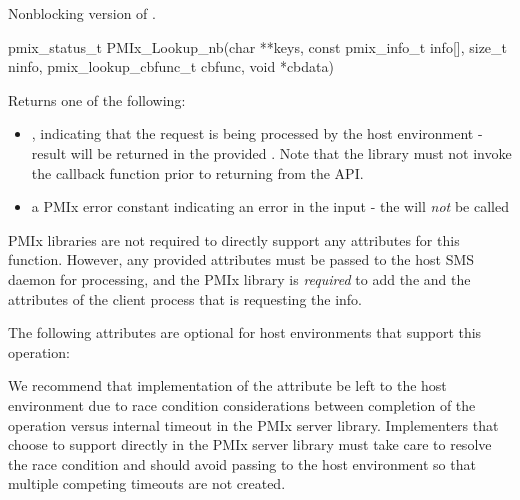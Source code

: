 \summary

Nonblocking version of .

\format

\cspecificstart
\begin{codepar}
pmix_status_t
PMIx_Lookup_nb(char **keys,
               const pmix_info_t info[], size_t ninfo,
               pmix_lookup_cbfunc_t cbfunc, void *cbdata)
\end{codepar}
\cspecificend

\begin{arglist}
\end{arglist}

Returns one of the following:

\begin{itemize}
    \item {}, indicating that the request is being processed by the host environment - result will be returned in the provided . Note that the library must not invoke the callback function prior to returning from the \ac{API}.
    \item a PMIx error constant indicating an error in the input - the  will \textit{not} be called
\end{itemize}


\reqattrstart
\ac{PMIx} libraries are not required to directly support any attributes for this function. However, any provided attributes must be passed to the host \ac{SMS} daemon for processing, and the \ac{PMIx} library is \textit{required} to add the  and the  attributes of the client process that is requesting the info.

\reqattrend

\optattrstart
The following attributes are optional for host environments that support this operation:


\optattrend

\adviceimplstart
We recommend that implementation of the  attribute be left to the host environment due to race condition considerations between completion of the operation versus internal timeout in the \ac{PMIx} server library. Implementers that choose to support  directly in the \ac{PMIx} server library must take care to resolve the race condition and should avoid passing  to the host environment so that multiple competing timeouts are not created.
\adviceimplend


